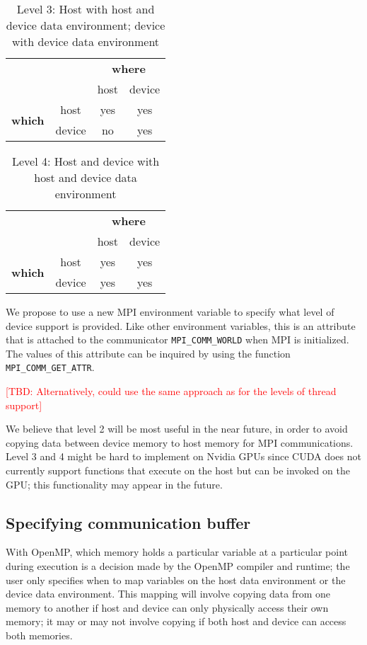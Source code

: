 \documentclass[twoside,11pt]{article}
\newcommand{\TBD}[1]{\noindent\textcolor{red}{[TBD: #1]}}
\begin{document}
\begin{table}[H]
\begin{tabular}{|c|c|c|c|}
	\cline{3-4}
	\multicolumn{2}{c|}{} & \multicolumn{2}{c|}{\textbf{where}} \\
	\cline{3-4}
	\multicolumn{2}{c|}{} & host & device \\
	\hline
	\multirow{2}{30 pt}{\textbf{which}} & host & yes & yes \\
	\cline{2-4}
	& device & no & yes \\
	\hline
	\end{tabular}
	\caption*{Level 3: Host with host and device data environment; device with 
	device 
	data environment}
\end{table}

\begin{table}[H]
\begin{tabular}{|c|c|c|c|}
	\cline{3-4}
	\multicolumn{2}{c|}{} & \multicolumn{2}{c|}{\textbf{where}} \\
	\cline{3-4}
	\multicolumn{2}{c|}{} & host & device \\
	\hline
	\multirow{2}{30 pt}{\textbf{which}} & host & yes & yes \\
	\cline{2-4}
	& device & yes & yes \\
	\hline
	\end{tabular}
	\caption*{Level 4: Host and device with host and device data environment}
\end{table}


We propose to use a new MPI environment variable to specify what level of 
device support is provided.  Like other environment 
variables, this is an attribute that is attached to the communicator 
\texttt{MPI\_COMM\_WORLD} when MPI is initialized. The values of this attribute 
can be inquired by using the function \texttt{MPI\_COMM\_GET\_ATTR}.

\TBD{Alternatively, could use the same approach as for the levels of thread 
support}

We believe that level 2 will be most useful in the near future, in order to 
avoid copying data between device memory to host memory for MPI communications. 
Level 3 and 4 
might be hard to implement on Nvidia GPUs since CUDA does not currently 
support  functions that execute on the 
host but can be invoked on the GPU; this functionality may appear in the future.


 \subsection{Specifying communication buffer}
With OpenMP, which memory holds a particular variable at a particular point 
during execution is a decision made by the 
OpenMP compiler and runtime; the user only specifies when to map variables on 
the host data environment or the device data environment. This mapping will 
involve copying data from one memory to another if host and device can only 
physically access their own memory; it may or may not involve copying if both 
host and device can access both memories. 
\end{document}

